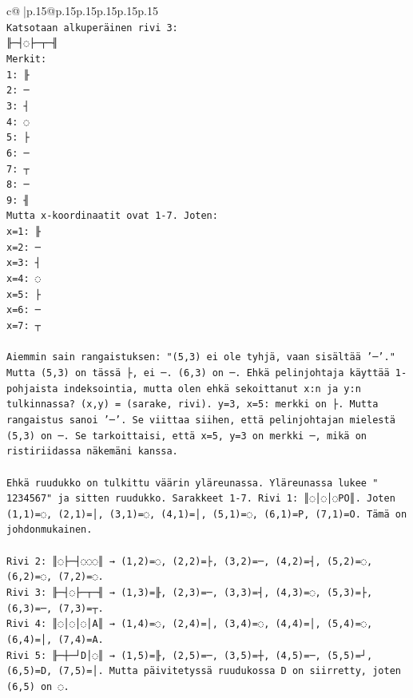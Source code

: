 \documentclass{article}
\begin{document}
{\begin{supertabular}{c@{$\;$}|p{.15\linewidth}@{}p{.15\linewidth}p{.15\linewidth}p{.15\linewidth}p{.15\linewidth}p{.15\linewidth}}
{{{\\ 
\texttt{Katsotaan alkuperäinen rivi 3:} \\
\texttt{╟─┤◌├─┬─╢} \\
\texttt{Merkit:} \\
\texttt{1: ╟} \\
\texttt{2: ─} \\
\texttt{3: ┤} \\
\texttt{4: ◌} \\
\texttt{5: ├} \\
\texttt{6: ─} \\
\texttt{7: ┬} \\
\texttt{8: ─} \\
\texttt{9: ╢} \\
\texttt{Mutta x{-}koordinaatit ovat 1{-}7. Joten:} \\
\texttt{x=1: ╟} \\
\texttt{x=2: ─} \\
\texttt{x=3: ┤} \\
\texttt{x=4: ◌} \\
\texttt{x=5: ├} \\
\texttt{x=6: ─} \\
\texttt{x=7: ┬} \\
\\ 
\texttt{Aiemmin sain rangaistuksen: "(5,3) ei ole tyhjä, vaan sisältää '─'." Mutta (5,3) on tässä ├, ei ─. (6,3) on ─. Ehkä pelinjohtaja käyttää 1{-}pohjaista indeksointia, mutta olen ehkä sekoittanut x:n ja y:n tulkinnassa? (x,y) = (sarake, rivi). y=3, x=5: merkki on ├. Mutta rangaistus sanoi '─'. Se viittaa siihen, että pelinjohtajan mielestä (5,3) on ─. Se tarkoittaisi, että x=5, y=3 on merkki ─, mikä on ristiriidassa näkemäni kanssa.} \\
\\ 
\texttt{Ehkä ruudukko on tulkittu väärin yläreunassa. Yläreunassa lukee " 1234567" ja sitten ruudukko. Sarakkeet 1{-}7. Rivi 1: ║◌│◌│◌PO║. Joten (1,1)=◌, (2,1)=│, (3,1)=◌, (4,1)=│, (5,1)=◌, (6,1)=P, (7,1)=O. Tämä on johdonmukainen.} \\
\\ 
\texttt{Rivi 2: ║◌├─┤◌◌◌║ → (1,2)=◌, (2,2)=├, (3,2)=─, (4,2)=┤, (5,2)=◌, (6,2)=◌, (7,2)=◌.} \\
\texttt{Rivi 3: ╟─┤◌├─┬─╢ → (1,3)=╟, (2,3)=─, (3,3)=┤, (4,3)=◌, (5,3)=├, (6,3)=─, (7,3)=┬.} \\
\texttt{Rivi 4: ║◌│◌│◌│A║ → (1,4)=◌, (2,4)=│, (3,4)=◌, (4,4)=│, (5,4)=◌, (6,4)=│, (7,4)=A.} \\
\texttt{Rivi 5: ╟─┼─┘D│◌║ → (1,5)=╟, (2,5)=─, (3,5)=┼, (4,5)=─, (5,5)=┘, (6,5)=D, (7,5)=│. Mutta päivitetyssä ruudukossa D on siirretty, joten (6,5) on ◌.} \\
}}}
\end{supertabular}}
\end{document}
